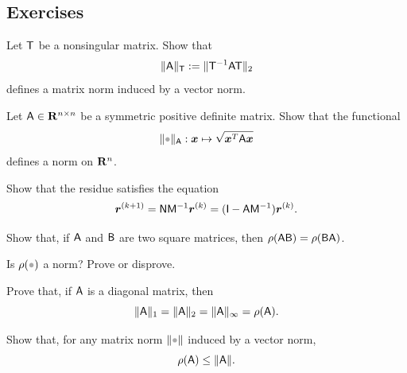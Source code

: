\subsection{Exercises}%

\begin{exercise}
    Let $\mathsf T$ be a nonsingular matrix.
    Show that
    \[
        \lVert\mathsf A\rVert_{\mathsf T} := \lVert\mathsf T^{-1} \mathsf A \mathsf T\rVert_2
    \]
    defines a matrix norm induced by a vector norm.
\end{exercise}

\begin{exercise}
    Let $\mathsf A \in \mathbf R^{n \times n}$ be a symmetric positive definite matrix.
    Show that the functional
    \[
        \norm{\placeholder}_{\mat A}: \vect x \mapsto \sqrt{\vect x^\t \mat A \vect x}
    \]
    defines a norm on $\mathbf R^n$.
\end{exercise}

\begin{exercise}
    Show that the residue satisfies the equation
    \[
        \mathbf{\boldsymbol{r}}^{(k+1)} = \mathsf N \mathsf M^{-1} \mathbf{\boldsymbol{r}}^{(k)} = (\mathsf I - \mathsf A \mathsf M^{-1}) \mathbf{\boldsymbol{r}}^{(k)}.
    \]
\end{exercise}

\begin{exercise}
    Show that, if $\mathsf A$ and $\mathsf B$ are two square matrices,
    then $\rho(\mathsf A \mathsf B) = \rho(\mathsf B \mathsf A)$.
\end{exercise}

\begin{exercise}
    Is $\rho(\placeholder)$ a norm? Prove or disprove.
\end{exercise}

\begin{exercise}
    Prove that, if $\mathsf A$ is a diagonal matrix, then
    \[
        \lVert\mathsf A\rVert_1 = \lVert\mathsf A\rVert_2 = \lVert\mathsf A\rVert_{\infty} = \rho(\mathsf A).
    \]
\end{exercise}

\begin{exercise}
    Show that, for any matrix norm $\norm{\placeholder}$ induced by a vector norm,
    \[
        \rho(\mathsf A) \leq \lVert\mathsf A\rVert.
    \]
\end{exercise}

